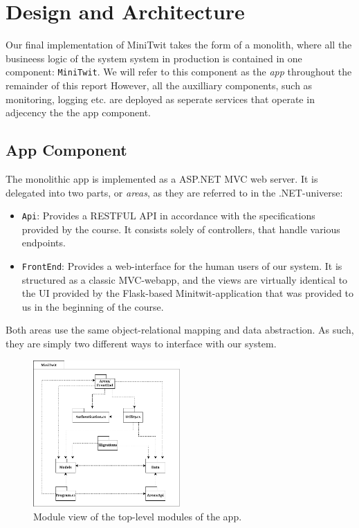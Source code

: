 \section{Design and Architecture}\label{sec:design-arch}

Our final implementation of MiniTwit takes the form of a monolith, where all the busineess logic of the system system in production is contained in one component: \texttt{MiniTwit}. We will refer to this component as the \textit{app} throughout the remainder of this report
However, all the auxilliary components, such as monitoring, logging etc. are deployed as seperate services that operate in adjecency the the app component.


\subsection{App Component}

The monolithic app is implemented as a ASP.NET MVC web server. It is delegated into two parts, or \textit{areas}, as they are referred to in the .NET-universe:

\begin{itemize}
    \item \texttt{Api}: Provides a RESTFUL API in accordance with the specifications provided by the course. It consists solely of controllers, that handle various endpoints.
    \item \texttt{FrontEnd}: Provides a web-interface for the human users of our system. It is structured as a classic MVC-webapp, and the views are virtually identical to the UI provided by the Flask-based Minitwit-application that was provided to us in the beginning of the course.
\end{itemize}

Both areas use the same object-relational mapping and data abstraction. As such, they are simply two different ways to interface with our system.

\begin{figure}
  \begin{center}
    \includegraphics[width=0.50\textwidth]{img/module1.pdf}
  \end{center}
  \caption{Module view of the top-level modules of the app.}\label{fig:module1}
\end{figure}



